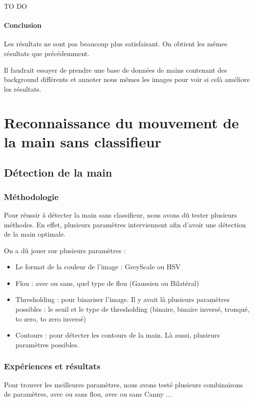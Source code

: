 \documentclass[11pt]{article}
\begin{document}
{\LARGE TO DO}

\paragraph{Conclusion}
Les résultats ne sont pas beaucoup plus satisfaisant. On obtient les mêmes résultats que précédemment. \bigbreak

Il faudrait essayer de prendre une base de données de mains contenant des background différents et annoter nous mêmes les images pour voir si celà améliore les résultats. \bigbreak


\section{Reconnaissance du mouvement de la main sans classifieur}
\subsection{Détection de la main}
\subsubsection{Méthodologie}
Pour réussir à détecter la main sans classifieur, nous avons dû tester plusieurs méthodes. En effet, plusieurs paramètres interviennent afin d'avoir une détection de la main optimale.

On a dû jouer sur plusieurs paramètres :
\begin{itemize}
    \item Le format de la couleur de l'image : GreyScale ou HSV
    \item Flou : avec ou sans, quel type de flou (Gaussien ou Bilatéral)
    \item Thresholding : pour binariser l'image. Il y avait là plusieurs paramètres possibles : le seuil et le type de thresholding (binaire, binaire inversé, tronqué, to zero, to zero inversé)
    \item Contours : pour détecter les contours de la main. Là aussi, plusieurs paramètres possibles.
\end{itemize}

\subsubsection{Expériences et résultats}
Pour trouver les meilleures paramètres, nous avons testé plusieurs combinaisons de paramètres, avec ou sans flou, avec ou sans Canny ...
\end{document}
